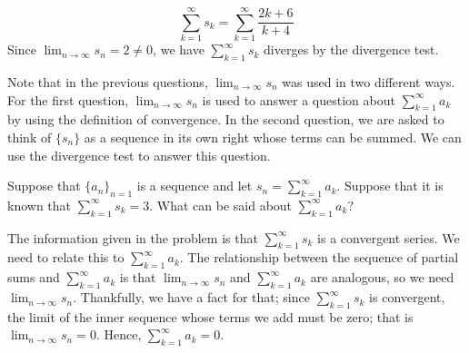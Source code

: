 \documentclass{ximera}
\begin{document}
\begin{example}
\begin{question}
\begin{feedback}
\[
\sum_{k=1}^{\infty} s_k =\sum_{k=1}^{\infty} \frac{2k+6}{k+4}
\]
Since $\lim_{n \to \infty} s_n = 2\neq 0$, we have $\sum_{k=1}^{\infty} s_k$ diverges by the divergence test. 
\end{feedback}
\end{question}

Note that in the previous questions, $\lim_{n \to \infty} s_n$ was used in two different ways.  For the first question, $\lim_{n \to \infty} s_n$ is used to answer a question about $\sum_{k=1}^{\infty} a_k$ by using the definition of convergence.  In the second question, we are asked to think of $\{s_n\}$ as a sequence in its own right whose terms can be summed.  We can use the divergence test to answer this question.
\end{example}

\begin{example}
Suppose that $\{a_n\}_{n=1}$ is a sequence and let $s_n = \sum_{k=1}^{\infty} a_k$.  Suppose that it is known that $\sum_{k=1}^{\infty} s_k =3$.  What can be said about $\sum_{k=1}^{\infty} a_k$?

\begin{multipleChoice}
\end{multipleChoice}

\begin{feedback}
The information given in the problem is that $\sum_{k=1}^{\infty} s_k$ is a convergent series.  We need to relate this to $\sum_{k=1}^{\infty} a_k$.  The relationship between the sequence of partial sums and $\sum_{k=1}^{\infty} a_k$ is that $\lim_{n \to \infty} s_n$ and $\sum_{k=1}^{\infty} a_k$ are analogous, so we need $\lim_{n \to \infty} s_n$.  Thankfully, we have a fact for that; since $\sum_{k=1}^{\infty} s_k$ is convergent, the limit of the inner sequence whose terms we add must be zero; that is  $\lim_{n \to \infty} s_n=0$.  Hence, $\sum_{k=1}^{\infty} a_k=0$.
\end{feedback}

\end{example}
\end{document}
